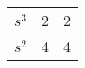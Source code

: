 \begin{table}[H]
\centering
\begin{tabularx}{0.1\textwidth}{l X X}

$s^3$ & 2 & 2 \\
$s^2$ & 4 & 4 \\

\end{tabularx}
\caption*{}
\end{table}